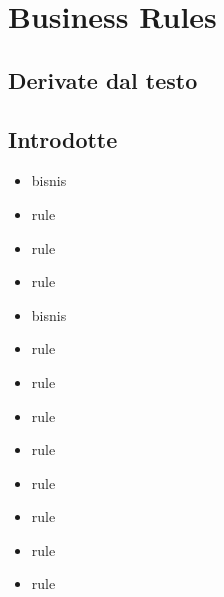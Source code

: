 \section{Business Rules}
\subsection{Derivate dal testo}

\subsection{Introdotte}
\begin{itemize}[label=]
    \item bisnis
    \item rule
    \item rule
    \item rule
    \item bisnis
    \item   rule
    \item   rule
    \item   rule
    \item   rule
    \item       rule
    \item    rule
    \item   rule
    \item   rule
\end{itemize}